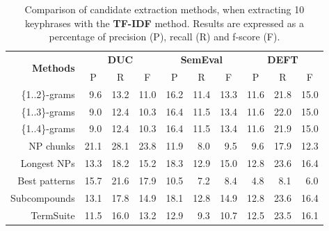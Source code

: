     \begin{table}[h]
      \centering
      \begin{tabular}{rccccccccc}
        \toprule
        \multirow{2}{*}[-2pt]{\textbf{Methods}} & \multicolumn{3}{c}{\textbf{DUC}} & \multicolumn{3}{c}{\textbf{SemEval}} & \multicolumn{3}{c}{\textbf{DEFT}}\\
        \cmidrule(r){2-4}\cmidrule(lr){5-7}\cmidrule(l){8-10}
        & P & R & F & P & R & F & P & R & F\\
        \midrule
        \{1..2\}-grams & ${~~}$9.6 & 13.2 & 11.0 & 16.2 & 11.4 & 13.3 & 11.6 & 21.8 & 15.0\\
        \{1..3\}-grams & ${~~}$9.0 & 12.4 & 10.3 & 16.4 & 11.5 & 13.4 & 11.6 & 22.0 & 15.0\\
        \{1..4\}-grams & ${~~}$9.0 & 12.4 & 10.3 & 16.4 & 11.5 & 13.4 & 11.6 & 21.9 & 15.0\\
        NP chunks & 21.1 & 28.1 & 23.8 & 11.9 & $~~$8.0 & $~~$9.5 & $~~$9.6 & 17.9 & 12.3\\
        Longest NPs & 13.3 & 18.2 & 15.2 & 18.3 & 12.9 & 15.0 & 12.8 & 23.6 & 16.4\\
        Best patterns & 15.7 & 21.6 & 17.9 & 10.5 & $~~$7.2 & $~~$8.4 & $~~$4.8 & $~~$8.1 & $~~$6.0\\
        Subcompounds & 13.1 & 17.8 & 14.9 &18.1 & 12.8 & 14.9 & 12.8 & 23.6 & 16.4\\
        TermSuite & 11.5 & 16.0 & 13.2 & 12.9 & ${~~}$9.3 & 10.7 & 12.5 & 23.5 & 16.1\\
        \bottomrule
      \end{tabular}
      \caption{Comparison of candidate extraction methods, when extracting 10
               keyphrases with the \textbf{TF-IDF} method. Results are expressed
               as a percentage of precision (P), recall (R) and f-score (F).
               \label{tab:keyphrase_extraction_results}}
    \end{table}

